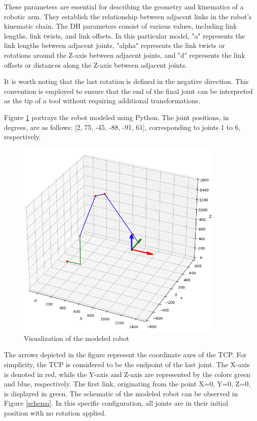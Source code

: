 These parameters are essential for describing the geometry and kinematics of a robotic arm. They establish the relationship between adjacent links in the robot's kinematic chain. The \acrshort{DH} parameters consist of various values, including link lengths, link twists, and link offsets. In this particular model, "a" represents the link lengths between adjacent joints, "alpha" represents the link twists or rotations around the Z-axis between adjacent joints, and "d" represents the link offsets or distances along the Z-axis between adjacent joints.

It is worth noting that the last rotation is defined in the negative direction. This convention is employed to ensure that the end of the final joint can be interpreted as the tip of a tool without requiring additional transformations.

Figure \ref{robotprog} portrays the robot modeled using Python. The joint positions, in degrees, are as follows: [2, 75, -45, -88, -91, 61], corresponding to joints 1 to 6, respectively.

 \begin{figure}[H]
	\centerline{\includegraphics[width=0.9\textwidth]{figures/robotprog.png}}
	\caption{Visualization of the modeled robot}
	\label{robotprog}
\end{figure}


The arrows depicted in the figure represent the coordinate axes of the \acrshort{TCP}. For simplicity, the \acrshort{TCP} is considered to be the endpoint of the last joint. The X-axis is denoted in red, while the Y-axis and Z-axis are represented by the colors green and blue, respectively. The first link, originating from the point X=0, Y=0, Z=0, is displayed in green.
\newpage
The schematic of the modeled robot can be observed in Figure \ref{schema}. In this specific configuration, all joints are in their initial position with no rotation applied.


